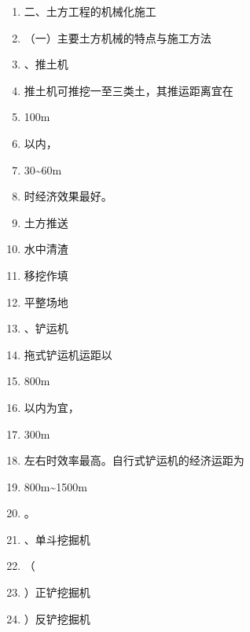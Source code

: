 \documentclass[UTF8,fontset=fandol,11pt]{ctexart}
\begin{document}
\begin{enumerate}[label=\arabic*.]

\item 二、土方工程的机械化施工

\item （一）主要土方机械的特点与施工方法

\item 、推土机

\item 推土机可推挖一至三类土，其推运距离宜在

\item 100m

\item 以内，

\item 30\textasciitilde{}60m

\item 时经济效果最好。

\item 土方推送

\item 水中清渣

\item 移挖作填

\item 平整场地

\item 、铲运机

\item 拖式铲运机运距以

\item 800m

\item 以内为宜，

\item 300m

\item 左右时效率最高。自行式铲运机的经济运距为

\item 800m\textasciitilde{}1500m

\item 。

\item 、单斗挖掘机

\item （

\item ）正铲挖掘机

\item ）反铲挖掘机

\end{enumerate}
\end{document}

